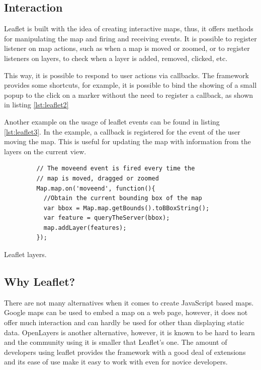 \subsection*{Interaction}

Leaflet is built with the idea of creating interactive maps, thus, it offers methods for manipulating the map and firing and receiving events. It is possible to register listener on map actions, such as when a map is moved or zoomed, or to register listeners on layers, to check when a layer is added, removed, clicked, etc.

This way, it is possible to respond to user actions via callbacks. The framework provides some shortcuts, for example, it is possible to bind the showing of a small popup to the click on a marker without the need to register a callback, as shown in listing \ref{lst:leaflet2}

Another example on the usage of leaflet events can be found in listing \ref{lst:leaflet3}. In the example, a callback is registered for the event of the user moving the map. This is useful for updating the map with information from the layers on the current view.

\begin{listing}\centering
  \begin{minipage}{.5\textwidth}
    \begin{verbatim}
	     // The moveend event is fired every time the
	     // map is moved, dragged or zoomed
	     Map.map.on('moveend', function(){
	       //Obtain the current bounding box of the map
	       var bbox = Map.map.getBounds().toBBoxString();
	       var feature = queryTheServer(bbox);
	       map.addLayer(features);
	     });
    \end{verbatim}
  \end{minipage}
  \caption{Leaflet layers.}\label{lst:leaflet3}
\end{listing}

\subsection*{Why Leaflet?}

There are not many alternatives when it comes to create JavaScript based maps. Google maps can be used to embed a map on a web page, however, it does not offer much interaction and can hardly be used for other than displaying static data. OpenLayers is another alternative, however, it is known to be hard to learn and the community using it is smaller that Leaflet's one. The amount of developers using leaflet provides the framework with a good deal of extensions and its ease of use make it easy to work with even for novice developers.

